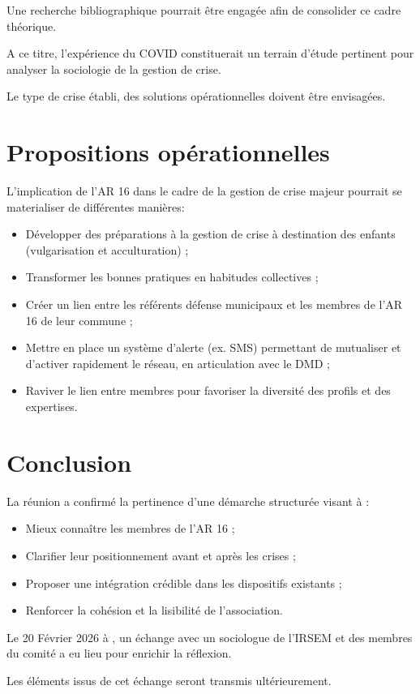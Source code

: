 \documentclass[12pt,a4paper]{article}
\begin{document}
Une recherche bibliographique pourrait être engagée afin de consolider ce cadre théorique.

A ce titre, l'expérience du COVID constituerait un terrain d'étude pertinent pour analyser la sociologie de la gestion de crise.

Le type de crise établi, des solutions opérationnelles doivent être envisagées.

\section*{Propositions opérationnelles}

L'implication de l'AR 16 dans le cadre de la gestion de crise majeur pourrait se materialiser de différentes manières:

\begin{itemize}
    \item Développer des préparations à la gestion de crise à destination des enfants (vulgarisation et acculturation) ;
    \item Transformer les bonnes pratiques en habitudes collectives ;
    \item Créer un lien entre les référents défense municipaux et les membres de l'AR 16 de leur commune ;
    \item Mettre en place un système d'alerte (ex. SMS) permettant de mutualiser et d'activer rapidement le réseau, en articulation avec le DMD ;
    \item Raviver le lien entre membres pour favoriser la diversité des profils et des expertises.
\end{itemize}

\newpage

\section*{Conclusion}

La réunion a confirmé la pertinence d'une démarche structurée visant à :

\begin{itemize}
    \item Mieux connaître les membres de l'AR 16 ;
    \item Clarifier leur positionnement avant et après les crises ;
    \item Proposer une intégration crédible dans les dispositifs existants ;
    \item Renforcer la cohésion et la lisibilité de l'association.
\end{itemize}

Le 20 Février 2026 à , un échange avec un sociologue de l'IRSEM et des membres du comité a eu lieu pour enrichir la réflexion.

Les éléments issus de cet échange seront transmis ultérieurement.
\end{document}
